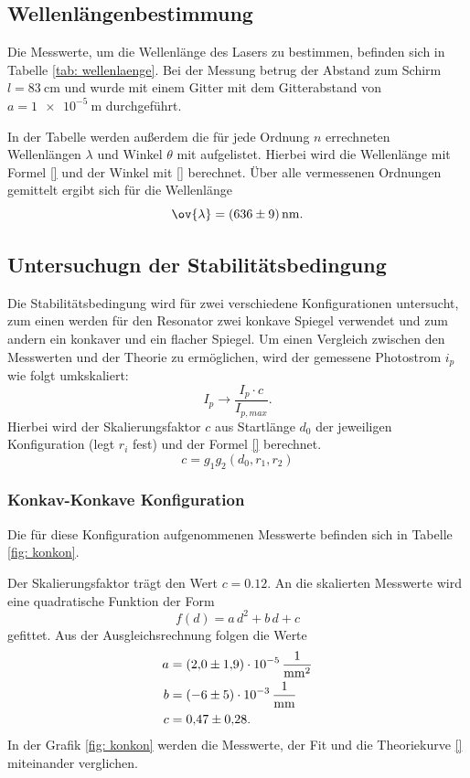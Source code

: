\subsection{Wellenlängenbestimmung}
Die Messwerte, um die Wellenlänge des Lasers zu bestimmen, befinden sich in Tabelle  \ref{tab: wellenlaenge}.
Bei der Messung betrug der Abstand zum Schirm $l=\SI{83}{\centi\meter}$
und wurde mit einem Gitter mit dem Gitterabstand von $a=\SI{1e-5}{\meter}$ durchgeführt.

In der Tabelle werden außerdem die für jede Ordnung $n$ errechneten Wellenlängen $\lambda$ und Winkel $\theta$
mit aufgelistet. Hierbei wird die Wellenlänge mit Formel \eqref{} und der Winkel mit \eqref{} berechnet.
Über alle vermessenen Ordnungen gemittelt ergibt sich für die Wellenlänge
\begin{equation}
  \label{eq: mittelwert_wellenlaenge}
  \ov{\lambda}=\SI{636\pm9}{\nano\meter}.
\end{equation}
\FloatBarrier
\FloatBarrier
\subsection{Untersuchugn der Stabilitätsbedingung}
Die Stabilitätsbedingung wird für zwei verschiedene Konfigurationen untersucht,
zum einen werden für den Resonator zwei konkave Spiegel verwendet und zum andern
ein konkaver und ein flacher Spiegel.
Um einen Vergleich zwischen den Messwerten und der Theorie zu ermöglichen, wird der gemessene
Photostrom $i_p$ wie folgt umkskaliert:
\begin{equation*}
  I_p \rightarrow \frac{I_p\cdot c}{I_{p,max}}.
\end{equation*}
Hierbei wird der Skalierungsfaktor  $c$ aus Startlänge $d_0$ der jeweiligen Konfiguration (legt $r_i$ fest) und der Formel
\eqref{} berechnet.
\begin{equation*}
  c=g_1g_2(d_0, r_1, r_2)
\end{equation*}

\FloatBarrier
\FloatBarrier
\subsubsection{Konkav-Konkave Konfiguration}

Die für diese Konfiguration aufgenommenen Messwerte befinden sich in Tabelle \ref{fig: konkon}.

Der Skalierungsfaktor trägt den Wert $c=\num{0.12}$.
An die skalierten Messwerte wird eine quadratische Funktion der Form
\begin{equation*}
  f(d)=a\,d^2+b\,d+c
\end{equation*}
gefittet. Aus der Ausgleichsrechnung folgen die Werte
\begin{align}
  \label{eq: fit_konkon}
  \begin{aligned}
    a&=\SI{2.0\pm 1.9 e-5}{\per\square\milli\meter}\\
    b&=\SI{-6\pm5 e-3}{\per\milli\meter}\\
    c&=\num{0.47\pm0.28}.
  \end{aligned}
\end{align}
In der Grafik \ref{fig: konkon} werden die Messwerte, der Fit und die Theoriekurve \eqref{} miteinander verglichen.

